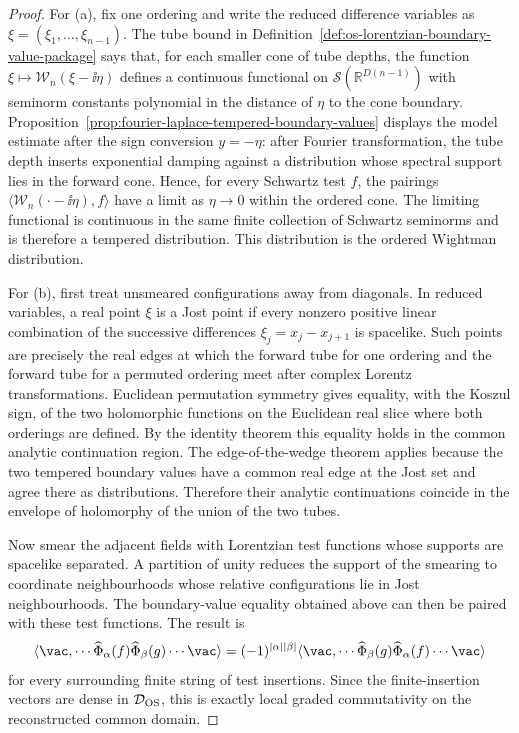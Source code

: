 \begin{proof}
For (a), fix one ordering and write the reduced difference variables as
\(\xi=(\xi_1,\ldots,\xi_{n-1})\).  The tube bound in
Definition~\ref{def:os-lorentzian-boundary-value-package} says that, for
each smaller cone of tube depths, the function
\(\xi\mapsto\mathcal W_n(\xi-\ii\eta)\) defines a continuous functional on
\(\mathcal S(\mathbb R^{D(n-1)})\) with seminorm constants polynomial in the
distance of \(\eta\) to the cone boundary.  Proposition~\ref{prop:fourier-laplace-tempered-boundary-values}
displays the model estimate after the sign conversion \(y=-\eta\): after
Fourier transformation, the tube depth inserts exponential damping against a
distribution whose spectral support lies in the forward cone.  Hence, for
every Schwartz test \(f\), the
pairings
\(\langle\mathcal W_n(\cdot-\ii\eta),f\rangle\) have a limit as
\(\eta\to0\) within the ordered cone.  The limiting functional is continuous in
the same finite collection of Schwartz seminorms and is therefore a tempered
distribution.  This distribution is the ordered Wightman distribution.

For (b), first treat unsmeared configurations away from diagonals.  In
reduced variables, a real point \(\xi\) is a Jost point if every nonzero
positive linear combination of the successive differences
\(\xi_j=x_j-x_{j+1}\) is spacelike.  Such points are precisely the real
edges at which the forward tube for one ordering and the forward tube for a
permuted ordering meet after complex Lorentz transformations.  Euclidean
permutation symmetry gives equality, with the Koszul sign, of the two
holomorphic functions on the Euclidean real slice where both orderings are
defined.  By the identity theorem this equality holds in the common analytic
continuation region.  The edge-of-the-wedge theorem applies because the two
tempered boundary values have a common real edge at the Jost set and agree
there as distributions.  Therefore their analytic continuations coincide in
the envelope of holomorphy of the union of the two tubes.

Now smear the adjacent fields with Lorentzian test functions whose supports
are spacelike separated.  A partition of unity reduces the support of the
smearing to coordinate neighbourhoods whose relative configurations lie in
Jost neighbourhoods.  The boundary-value equality obtained above can then be
paired with these test functions.  The result is
\[
  \langle\vac,
    \cdots \widehat\Phi_\alpha(f)\widehat\Phi_\beta(g)\cdots\vac\rangle
  =
  (-1)^{|\alpha||\beta|}
  \langle\vac,
    \cdots \widehat\Phi_\beta(g)\widehat\Phi_\alpha(f)\cdots\vac\rangle
\]
for every surrounding finite string of test insertions.  Since the
finite-insertion vectors are dense in \(\mathcal D_{\rm OS}\), this is
exactly local graded commutativity on the reconstructed common domain.


\end{proof}

